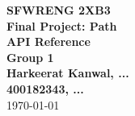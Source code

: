 \documentclass[11pt]{article}
\begin{document}
\begin{adjustwidth}{10mm}{}
\begin{center}

  {\large \textbf{SFWRENG 2XB3}}\\[8mm]
  {\huge \textbf{Final Project: Path}}\\[4mm]
  {\huge \textbf{API Reference}}\\[8mm]
  {\large \textbf{Group 1}}\\[2mm]
  {\large \textbf{Harkeerat Kanwal, ...}}\\[2mm]
  {\large \textbf{400182343, ...}}\\[5mm]
  {\large \today}

\end{center}
\end{adjustwidth}

\medskip
\end{document}
